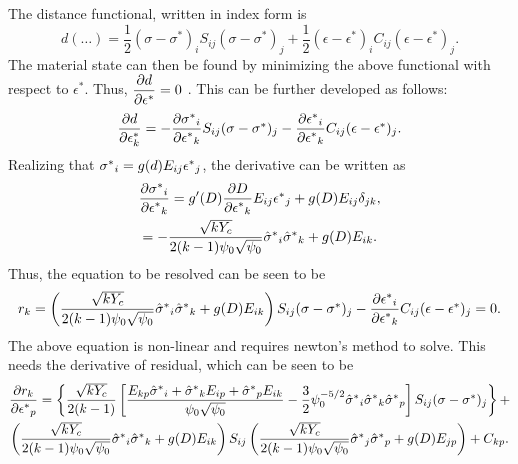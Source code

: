 \documentclass[10pt]{elsarticle}
\begin{document}
The distance functional, written in index form is
\begin{equation}
	d(\dots) = \frac{1}{2}(\sigma-\sigma^*)_i S_{ij} (\sigma-\sigma^*)_j + \frac{1}{2} (\epsilon-\epsilon^*)_i C_{ij} (\epsilon-\epsilon^*)_j.
\end{equation}
The material state can then be found by minimizing the above functional with respect to $\epsilon^*$. Thus, ${\dfrac{\partial d}{\partial \epsilon ^*}}=0$ . This can be further developed as follows:
\begin{equation}
	{\dfrac{\partial d}{\partial \epsilon ^*_k}} = -{\dfrac{\partial \mbox{$\sigma^*$}_i}{\partial \mbox{$\epsilon^*$}_k}} S_{ij} ({\sigma} - \mbox{$\sigma^*$})_j - {\dfrac{\partial \mbox{$\epsilon^*$}_i}{\partial \mbox{$\epsilon^*$}_k}} C_{ij}({\epsilon}-\mbox{$\epsilon^*$})_j.
\end{equation}
Realizing that $\mbox{$\sigma^*$}_i = g(d) E_{ij} \mbox{$\epsilon^*$}_j$, the derivative can be written as 
\begin{gather}
	{\dfrac{\partial  \mbox{$\sigma^*$}_i}{\partial  \mbox{$\epsilon^*$}_k}} = g'(D) {\dfrac{\partial D}{\partial \mbox{$\epsilon^*$}_k}} E_{ij} \mbox{$\epsilon^*$}_j + g(D) E_{ij} \delta_{jk}, \\
	= -\frac{\sqrt{k Y_c}}{2(k-1)\psi_0 \sqrt{\psi_0}} \mbox{$\hat{\sigma}^*$}_i \mbox{$\hat{\sigma}^*$}_k + g(D) E_{ik}.
\end{gather}
Thus, the equation to be resolved can be seen to be
\begin{equation}
	r_k = \left(\frac{\sqrt{k Y_c}}{2(k-1)\psi_0 \sqrt{\psi_0}} \mbox{$\hat{\sigma}^*$}_i \mbox{$\hat{\sigma}^*$}_k + g(D) E_{ik} \right) S_{ij} ({\sigma} - \mbox{$\sigma^*$})_j - {\dfrac{\partial \mbox{$\epsilon^*$}_i}{\partial \mbox{$\epsilon^*$}_k}} C_{ij}({\epsilon}-\mbox{$\epsilon^*$})_j = 0.
\end{equation}
The above equation is non-linear and requires newton's method to solve. This needs the derivative of residual, which can be seen to be
\begin{multline}
	{\dfrac{\partial r_k}{\partial  \mbox{$\epsilon^*$}_p}} = \left\{  \frac{\sqrt{k Y_c}}{2(k-1)} \left[ \frac{ E_{kp} \mbox{$\hat{\sigma}^*$}_i + \mbox{$\hat{\sigma}^*$}_k E_{ip} + \mbox{$\hat{\sigma}^*$}_p E_{ik} }{\psi_0 \sqrt{\psi_0}}-\frac{3}{2} \psi_0^{-5/2} \mbox{$\hat{\sigma}^*$}_i \mbox{$\hat{\sigma}^*$}_k \mbox{$\hat{\sigma}^*$}_p \right] S_{ij} ({\sigma} - \mbox{$\sigma^*$})_j  \right\} +  \\ 
	\left(\frac{\sqrt{k Y_c}}{2(k-1)\psi_0 \sqrt{\psi_0}} \mbox{$\hat{\sigma}^*$}_i \mbox{$\hat{\sigma}^*$}_k + g(D) E_{ik} \right) S_{ij} \left(\frac{\sqrt{k Y_c}}{2(k-1)\psi_0 \sqrt{\psi_0}} \mbox{$\hat{\sigma}^*$}_j \mbox{$\hat{\sigma}^*$}_p + g(D) E_{jp} \right) + C_{kp}.
\end{multline}
\end{document}
